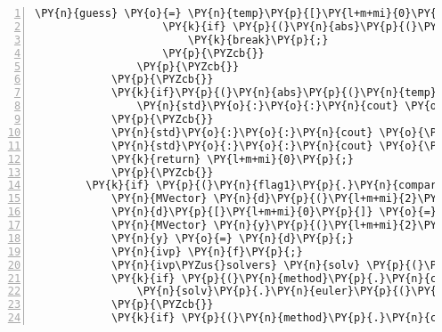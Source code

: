 \begin{Verbatim}[commandchars=\\\{\},numbers=left,firstnumber=1,stepnumber=1]
					\PY{n}{guess} \PY{o}{=} \PY{n}{temp}\PY{p}{[}\PY{l+m+mi}{0}\PY{p}{]}\PY{p}{;}
					\PY{k}{if} \PY{p}{(}\PY{n}{abs}\PY{p}{(}\PY{n}{temp}\PY{p}{[}\PY{l+m+mi}{1}\PY{p}{]}\PY{p}{)}\PY{o}{\PYZlt{}}\PY{n}{tol}\PY{p}{)}\PY{p}{\PYZob{}}
						\PY{k}{break}\PY{p}{;}
					\PY{p}{\PYZcb{}}
				\PY{p}{\PYZcb{}}
			\PY{p}{\PYZcb{}}
			\PY{k}{if}\PY{p}{(}\PY{n}{abs}\PY{p}{(}\PY{n}{temp}\PY{p}{[}\PY{l+m+mi}{1}\PY{p}{]}\PY{p}{)}\PY{o}{\PYZgt{}}\PY{l+m+mf}{1.}\PY{p}{)}\PY{p}{\PYZob{}} \PY{c+c1}{// deal with being unable to find the root}
				\PY{n}{std}\PY{o}{:}\PY{o}{:}\PY{n}{cout} \PY{o}{\PYZlt{}}\PY{o}{\PYZlt{}} \PY{l+s}{\PYZdq{}}\PY{l+s}{A root was not found during the shooting method. Something is probably wrong.}\PY{l+s}{\PYZdq{}} \PY{o}{\PYZlt{}}\PY{o}{\PYZlt{}} \PY{n}{std}\PY{o}{:}\PY{o}{:}\PY{n}{endl}\PY{p}{;}
			\PY{p}{\PYZcb{}}
			\PY{n}{std}\PY{o}{:}\PY{o}{:}\PY{n}{cout} \PY{o}{\PYZlt{}}\PY{o}{\PYZlt{}} \PY{l+s}{\PYZdq{}}\PY{l+s}{y(x): }\PY{l+s}{\PYZdq{}} \PY{o}{\PYZlt{}}\PY{o}{\PYZlt{}} \PY{n}{y}\PY{p}{[}\PY{l+m+mi}{0}\PY{p}{]} \PY{o}{\PYZlt{}}\PY{o}{\PYZlt{}} \PY{n}{std}\PY{o}{:}\PY{o}{:}\PY{n}{endl}\PY{p}{;} \PY{c+c1}{// output the important values}
			\PY{n}{std}\PY{o}{:}\PY{o}{:}\PY{n}{cout} \PY{o}{\PYZlt{}}\PY{o}{\PYZlt{}} \PY{l+s}{\PYZdq{}}\PY{l+s}{y\PYZsq{}(x): }\PY{l+s}{\PYZdq{}} \PY{o}{\PYZlt{}}\PY{o}{\PYZlt{}} \PY{n}{y}\PY{p}{[}\PY{l+m+mi}{1}\PY{p}{]} \PY{o}{\PYZlt{}}\PY{o}{\PYZlt{}} \PY{n}{std}\PY{o}{:}\PY{o}{:}\PY{n}{endl}\PY{p}{;}
			\PY{k}{return} \PY{l+m+mi}{0}\PY{p}{;}
			\PY{p}{\PYZcb{}}
		\PY{k}{if} \PY{p}{(}\PY{n}{flag1}\PY{p}{.}\PY{n}{compare}\PY{p}{(}\PY{l+s}{\PYZdq{}}\PY{l+s}{\PYZhy{}i}\PY{l+s}{\PYZdq{}}\PY{p}{)} \PY{o}{=}\PY{o}{=} \PY{l+m+mi}{0}\PY{p}{)}\PY{p}{\PYZob{}}
			\PY{n}{MVector} \PY{n}{d}\PY{p}{(}\PY{l+m+mi}{2}\PY{p}{)}\PY{p}{;} 
			\PY{n}{d}\PY{p}{[}\PY{l+m+mi}{0}\PY{p}{]} \PY{o}{=} \PY{l+m+mi}{17}\PY{p}{;} \PY{n}{d}\PY{p}{[}\PY{l+m+mi}{1}\PY{p}{]} \PY{o}{=} \PY{l+m+mi}{1}\PY{p}{;}
			\PY{n}{MVector} \PY{n}{y}\PY{p}{(}\PY{l+m+mi}{2}\PY{p}{)}\PY{p}{;}
			\PY{n}{y} \PY{o}{=} \PY{n}{d}\PY{p}{;}
			\PY{n}{ivp} \PY{n}{f}\PY{p}{;}
			\PY{n}{ivp\PYZus{}solvers} \PY{n}{solv} \PY{p}{(}\PY{n}{steps}\PY{p}{,} \PY{l+m+mf}{1.}\PY{p}{,} \PY{l+m+mf}{3.}\PY{p}{)}\PY{p}{;}
			\PY{k}{if} \PY{p}{(}\PY{n}{method}\PY{p}{.}\PY{n}{compare}\PY{p}{(}\PY{l+s}{\PYZdq{}}\PY{l+s}{euler}\PY{l+s}{\PYZdq{}}\PY{p}{)} \PY{o}{=}\PY{o}{=} \PY{l+m+mi}{0}\PY{p}{)}\PY{p}{\PYZob{}}
				\PY{n}{solv}\PY{p}{.}\PY{n}{euler}\PY{p}{(}\PY{n}{y}\PY{p}{,} \PY{n}{f}\PY{p}{,} \PY{n}{j}\PY{p}{)}\PY{p}{;}
			\PY{p}{\PYZcb{}}
			\PY{k}{if} \PY{p}{(}\PY{n}{method}\PY{p}{.}\PY{n}{compare}\PY{p}{(}\PY{l+s}{\PYZdq{}}\PY{l+s}{midpoint}\PY{l+s}{\PYZdq{}}\PY{p}{)} \PY{o}{=}\PY{o}{=} \PY{l+m+mi}{0}\PY{p}{)}\PY{p}{\PYZob{}}

\end{Verbatim}
